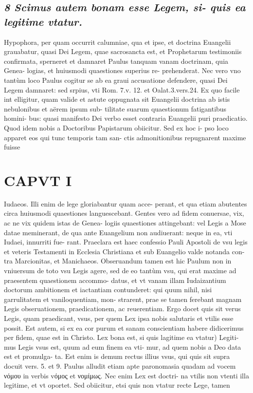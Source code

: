 \documentclass{article}
\begin{document}
\begin{pages}
\subsection*{\textit{8 Scimus autem bonam esse Legem, si- quis ea legitime vtatur. }}\pstart Hypophora, per quam occurrit calumniae, qua et ipse, et doctrina Euangelii grauabatur, quasi Dei Legem, quae sacrosancta est, et Prophetarum testimoniis confirmata, sperneret et damnaret Paulus tanquam vanam doctrinam, quia Genea- logias, et huiusmodi quaestiones superius re- prehenderat. Nec vero vno tantùm loco Paulus cogitur se ab ea graui accusatione defendere, quasi Dei Legem damnaret: sed srpius, vti Rom. 7.v. 12. et Oalat.3.vers.24. Ex quo facile int elligitur, quam valide et astute oppugnata sit Euangelii doctrina ab istis nebulonibus et aërem ipsum sub- tilitate suarum quaestionum fatigantibus homini- bus: quasi manifesto Dei verbo esset contraria Euangelii puri praedicatio. Quod idem nobis a Doctoribus Papistarum obiicitur. Sed ex hoc i- pso loco apparet eos qui tunc temporis tam san- ctis admonitionibus repugnarent maxime fuisse  \pend
\section*{CAPVT I }
\marginpar{[ p.19 ]}\pstart Iudaeos. Illi enim de lege gloriabantur quam acce- perant, et qua etiam abutentes circa huiusmodi quaestiones languescebant. Gentes vero ad fidem conuersae, vix, ac ne vix quidem istas de Genea- logiis quaestiones attingebant: vel Legis a Mose datae meminerant, de qua ante Euangelium non audiuerant: neque in ea, vti Iudaei, innurriti fue- rant. Praeclara est haec confessio Pauli Apostoli de vsu legis et veteris Testamenti in Ecclesia Christiana et sub Euangelio valde notanda con- tra Marcionitas, et Manichaeos. Obseruandum tamen est hic Paulum non in vniuersum de toto vsu Legis agere, sed de eo tantùm vsu, qui erat maxime ad praesentem quaestionem accommo- datus, et vt vanam illam Iudaizantium doctorum ambitionem et iactantiam contunderet: qui quum nihil, nisi garrulitatem et vaniloquentiam, mon- strarent, prae se tamen ferebant magnam Legis obseruationem, praedicationem, ac reuerentiam. Ergo docet quis sit verus Legis, quam praedicant, vsus, per quem Lex ipsa nobis salutaris et vtilis esse possit. Est autem, si ex ea cor purum et sanam conscientiam habere didicerimus per fidem, quae est in Christo.  \pend\pstart Lex bona est, si quis lagitime ea vtatur) Legiti- mus Legis vsus est, quum ad eum finem ea vti- mur, ad quem nobis a Deo data est et promulga- ta. Est enim is demum rectus illius vsus, qui quis sit supra docuit vers. 5. et 9. Paulus alludit etiam apte paronomasia quadam ad vocem νόμου in verbis vόμος et νομίμως. Nec enim Lex est doctri- na vtilis non vtenti illa legitime, et vt oportet. Sed obiicitur, etsi quis non vtatur recte Lege, tamen  \pend

\end{pages}
\end{document}

